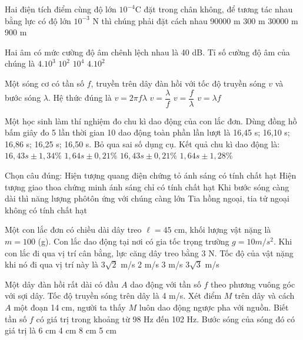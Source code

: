 \documentclass[11pt,a4paper]{book}
\begin{document}
\begin{ex} 
Hai điện tích điểm cùng độ lớn ${{10}^{-4}}$C đặt trong chân không, để tương tác nhau bằng lực có độ lớn ${{10}^{-3}}$ N thì chúng phải đặt cách nhau
\choice 
{ 90000 m}
{ 300 m}
{ 30000 m}
{ 900 m} \end{ex} 
\begin{ex} 
Hai âm có mức cường độ âm chênh lệch nhau là 40 dB. Tỉ số cường độ âm của chúng là
\choice 
{ ${{4.10}^3}$}
{ ${{10}^2}$}
{ ${{10}^4}$}
{ ${{4.10}^2}$} \end{ex} 
\begin{ex} 
Một sóng cơ có tần số $f$, truyền trên dây đàn hồi với tốc độ truyền sóng $v$ và bước sóng $\lambda $. Hệ thức đúng là
\choice 
{ $v=2\pi f\lambda $}
{ $v=\dfrac{\lambda }f$}
{ $v=\dfrac{f}{\lambda}$}
{ $v=\lambda f$} \end{ex} 
\begin{ex} 
Một học sinh làm thí nghiệm đo chu kì dao động của con lắc đơn. Dùng đồng hồ bấm giây đo 5 lần thời gian 10 dao động toàn phần lần lượt là 16,45 s; 16,10 s; 16,86 s; 16,25 s; 16,50 s. Bỏ qua sai số dụng cụ. Kết quả chu kì dao động là:
\choice 
{ $16,43s\pm 1,34\%$}
{ $1,64s\pm 0,21\%$}
	{ $16,43s\pm 0,21\%$}
		{ $1,64s\pm 1,28\%$} \end{ex} 
			\begin{ex} 
				Chọn câu đúng:
				\choice 
				{ Hiện tượng quang điện chứng tỏ ánh sáng có tính chất hạt} 
				{ Hiện tượng giao thoa chứng minh ánh sáng chỉ có tính chất hạt} 
				{ Khi bước sóng càng dài thì năng lượng phôtôn ứng với chúng càng lớn} 
				{ Tia hồng ngoại, tia tử ngoại không có tính chất hạt} \end{ex} 
			\begin{ex} 
				Một con lắc đơn có chiều dài dây treo $\ell =45$ cm, khối lượng vật nặng là $m=100$ (g). Con lắc dao động tại nơi có gia tốc trọng trường $g=10m/{{s}^2}$. Khi con lắc đi qua vị trí cân bằng, lực căng dây treo bằng 3 N. Tốc độ của vật nặng khi nó đi qua vị trí này là
				\choice 
				{ $3\sqrt{2}$ m/s}
				{ 2 m/s}
				{ 3 m/s}
				{ $3\sqrt{3}$  m/s} \end{ex} 
			\begin{ex} 
				Một dây đàn hồi rất dài có đầu $A$ dao động với tần số $f$ theo phương vuông góc với sợi dây. Tốc độ truyền sóng trên dây là 4 m/s. Xét điểm $M$ trên dây và cách $A$ một đoạn 14 cm, người ta thấy $M$ luôn dao động ngược pha với nguồn. Biết tần số $f$ có giá trị trong khoảng từ 98 Hz đến 102 Hz. Bước sóng của sóng đó có giá trị là
				\choice 
				{ 6 cm}
				{ 4 cm}
				{ 8 cm}
				{ 5 cm} \end{ex} 
\end{document}
